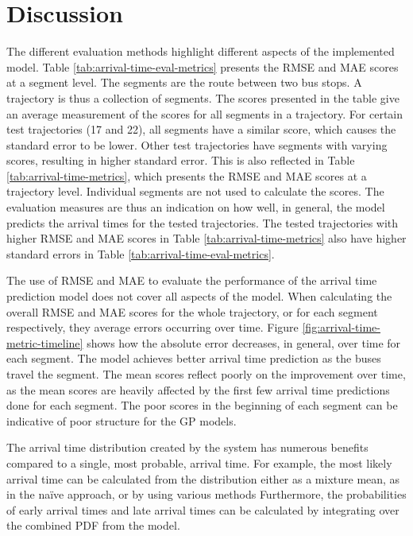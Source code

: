 \newpage
\section{Discussion}

The different evaluation methods highlight different aspects of the implemented model.
Table \ref{tab:arrival-time-eval-metrics} presents the RMSE and MAE scores at a segment level.
The segments are the route between two bus stops.
A trajectory is thus a collection of segments.
The scores presented in the table give an average measurement of the scores for all segments in a trajectory.
For certain test trajectories (17 and 22), all segments have a similar score, which causes the standard error to be lower.
Other test trajectories have segments with varying scores, resulting in higher standard error.
This is also reflected in Table \ref{tab:arrival-time-metrics}, which presents the RMSE and MAE scores at a trajectory level.
Individual segments are not used to calculate the scores.
The evaluation measures are thus an indication on how well, in general, the model predicts the arrival times for the tested trajectories.
The tested trajectories with higher RMSE and MAE scores in Table \ref{tab:arrival-time-metrics} also have higher standard errors in Table \ref{tab:arrival-time-eval-metrics}.

The use of RMSE and MAE to evaluate the performance of the arrival time prediction model does not cover all aspects of the model.
When calculating the overall RMSE and MAE scores for the whole trajectory, or for each segment respectively, they average errors occurring over time.
Figure \ref{fig:arrival-time-metric-timeline} shows how the absolute error decreases, in general, over time for each segment.
The model achieves better arrival time prediction as the buses travel the segment. 
The mean scores reflect poorly on the improvement over time, as the mean scores are heavily affected by the first few arrival time predictions done for each segment.
The poor scores in the beginning of each segment can be indicative of poor structure for the GP models.

The arrival time distribution created by the system has numerous benefits compared to a single, most probable, arrival time.
For example, the most likely arrival time can be calculated from the distribution either as a mixture mean, as in the naïve approach, or by using various methods \cite{Carreira2000, Comaniciu2002, Pulkkinen2013}
Furthermore, the probabilities of early arrival times and late arrival times can be calculated by integrating over the combined PDF from the model.

